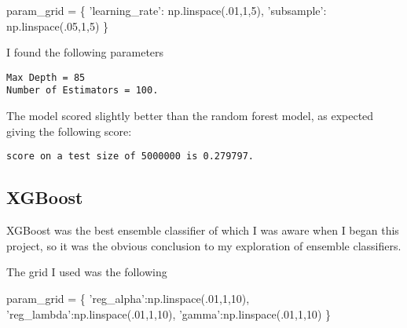 \documentclass[11pt]{article}
\newenvironment{Shaded}{}{}
\newcommand{\DecValTok}[1]{\textcolor[rgb]{0.25,0.63,0.44}{{#1}}}
\newcommand{\StringTok}[1]{\textcolor[rgb]{0.25,0.44,0.63}{{#1}}}
\newcommand{\NormalTok}[1]{{#1}}
\newcommand{\OperatorTok}[1]{\textcolor[rgb]{0.40,0.40,0.40}{{#1}}}
\begin{document}
\begin{Shaded}
\begin{Highlighting}[]
\NormalTok{param_grid }\OperatorTok{=}\NormalTok{ \{}
    \StringTok{'learning_rate'}\NormalTok{: np.linspace(.}\DecValTok{01}\NormalTok{,}\DecValTok{1}\NormalTok{,}\DecValTok{5}\NormalTok{),}
    \StringTok{'subsample'}\NormalTok{: np.linspace(.}\DecValTok{05}\NormalTok{,}\DecValTok{1}\NormalTok{,}\DecValTok{5}\NormalTok{)}
\NormalTok{\}}
\end{Highlighting}
\end{Shaded}

I found the following parameters

    \begin{Verbatim}[commandchars=\\\{\}]
Max Depth = 85
Number of Estimators = 100.

    \end{Verbatim}

    The model scored slightly better than the random forest model, as
expected giving the following score:

    \begin{Verbatim}[commandchars=\\\{\}]
score on a test size of 5000000 is 0.279797.

    \end{Verbatim}

    \hypertarget{xgboost}{%
\subsection{XGBoost}\label{xgboost}}

XGBoost was the best ensemble classifier of which I was aware when I
began this project, so it was the obvious conclusion to my exploration
of ensemble classifiers.

The grid I used was the following

\begin{Shaded}
\begin{Highlighting}[]
\NormalTok{param_grid }\OperatorTok{=}\NormalTok{ \{}
    \StringTok{'reg_alpha'}\NormalTok{:np.linspace(.}\DecValTok{01}\NormalTok{,}\DecValTok{1}\NormalTok{,}\DecValTok{10}\NormalTok{),}
    \StringTok{'reg_lambda'}\NormalTok{:np.linspace(.}\DecValTok{01}\NormalTok{,}\DecValTok{1}\NormalTok{,}\DecValTok{10}\NormalTok{),}
    \StringTok{'gamma'}\NormalTok{:np.linspace(.}\DecValTok{01}\NormalTok{,}\DecValTok{1}\NormalTok{,}\DecValTok{10}\NormalTok{)}
\NormalTok{\}}
\end{Highlighting}
\end{Shaded}
\end{document}
